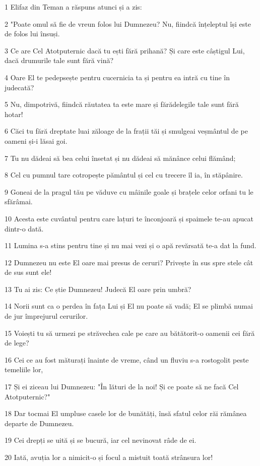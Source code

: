 \par 1 Elifaz din Teman a răspuns atunci și a zis:
\par 2 "Poate omul să fie de vreun folos lui Dumnezeu? Nu, fiindcă înțeleptul își este de folos lui însuși.
\par 3 Ce are Cel Atotputernic dacă tu ești fără prihană? Și care este câștigul Lui, dacă drumurile tale sunt fără vină?
\par 4 Oare El te pedepsește pentru cucernicia ta și pentru ea intră cu tine în judecată?
\par 5 Nu, dimpotrivă, fiindcă răutatea ta este mare și fărădelegile tale sunt fără hotar!
\par 6 Căci tu fără dreptate luai zăloage de la frații tăi și smulgeai veșmântul de pe oameni și-i lăsai goi.
\par 7 Tu nu dădeai să bea celui însetat și nu dădeai să mănânce celui flămând;
\par 8 Cel cu pumnul tare cotropește pământul și cel cu trecere îl ia, în stăpânire.
\par 9 Goneai de la pragul tău pe văduve cu mâinile goale și brațele celor orfani tu le sfărâmai.
\par 10 Acesta este cuvântul pentru care lațuri te înconjoară și spaimele te-au apucat dintr-o dată.
\par 11 Lumina s-a stins pentru tine și nu mai vezi și o apă revărsată te-a dat la fund.
\par 12 Dumnezeu nu este El oare mai presus de ceruri? Privește în sus spre stele cât de sus sunt ele!
\par 13 Tu ai zis: Ce știe Dumnezeu! Judecă El oare prin umbră?
\par 14 Norii sunt ca o perdea în fața Lui și El nu poate să vadă; El se plimbă numai de jur împrejurul cerurilor.
\par 15 Voiești tu să urmezi pe străvechea cale pe care au bătătorit-o oamenii cei fără de lege?
\par 16 Cei ce au fost măturați înainte de vreme, când un fluviu s-a rostogolit peste temeliile lor,
\par 17 Și ei ziceau lui Dumnezeu: "În lături de la noi! Și ce poate să ne facă Cel Atotputernic?"
\par 18 Dar tocmai El umpluse casele lor de bunătăți, însă sfatul celor răi rămânea departe de Dumnezeu.
\par 19 Cei drepți se uită și se bucură, iar cel nevinovat râde de ei.
\par 20 Iată, avuția lor a nimicit-o și focul a mistuit toată strânsura lor!
